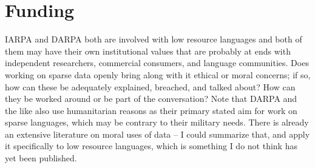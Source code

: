 \documentclass[10pt, a4paper]{article}
\begin{document}

%
%


\section{Funding}

IARPA and DARPA both are involved with low resource languages and both of them may have their own institutional values that are probably at ends with independent researchers, commercial consumers, and language communities. Does working on sparse data openly bring along with it ethical or moral concerns; if so, how can these be adequately explained, breached, and talked about? How can they be worked around or be part of the conversation? Note that DARPA and the like also use humanitarian reasons as their primary stated aim for work on sparse languages, which may be contrary to their military needs. There is already an extensive literature on moral uses of data -- I could summarize that, and apply it specifically to low resource languages, which is something I do not think has yet been published.
\end{document}
